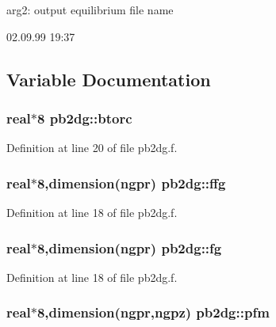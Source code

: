 arg2: output equilibrium file name

\begin{Desc}
\item[Version:]02.09.99 19:37 \end{Desc}


\subsection{Variable Documentation}
\hypertarget{namespacepb2dg_bb98e426dd9cafc894a6572df354a934}{
\subsubsection[btorc]{\setlength{\rightskip}{0pt plus 5cm}real$\ast$8 {\bf pb2dg::btorc}}}
\label{namespacepb2dg_bb98e426dd9cafc894a6572df354a934}




Definition at line 20 of file pb2dg.f.\hypertarget{namespacepb2dg_8877d818c19720f058d24c97e09aca0a}{
\subsubsection[ffg]{\setlength{\rightskip}{0pt plus 5cm}real$\ast$8,dimension(ngpr) {\bf pb2dg::ffg}}}
\label{namespacepb2dg_8877d818c19720f058d24c97e09aca0a}




Definition at line 18 of file pb2dg.f.\hypertarget{namespacepb2dg_c4bcb2972129007ba170774e3c4cd6e1}{
\subsubsection[fg]{\setlength{\rightskip}{0pt plus 5cm}real$\ast$8,dimension(ngpr) {\bf pb2dg::fg}}}
\label{namespacepb2dg_c4bcb2972129007ba170774e3c4cd6e1}




Definition at line 18 of file pb2dg.f.\hypertarget{namespacepb2dg_74ff9bdb9b47e6aa7d40970f2a1255db}{
\subsubsection[pfm]{\setlength{\rightskip}{0pt plus 5cm}real$\ast$8,dimension(ngpr,ngpz) {\bf pb2dg::pfm}}}
\label{namespacepb2dg_74ff9bdb9b47e6aa7d40970f2a1255db}




